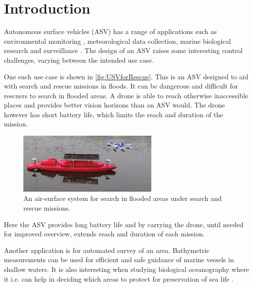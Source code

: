 \chapter{Introduction}

Autonomous surface vehicles (ASV) has a range of applications such as environmental monitoring \cite[p. 745]{MAHsieh}, meteorological data collection, marine biological research and surveillance \cite[p. 8-10]{FFahimi}.
The design of an ASV raises some interesting control challenges, varying between the intended use case.

One such use case is shown in \autoref{fig:USVforRescue}. 
This is an ASV designed to aid with search and rescue missions in floods. 
It can be dangerous and difficult for rescuers to search in flooded areas. 
A drone is able to reach otherwise inaccessible places and provides better vision horizons than an ASV would. 
The drone however has short battery life, which limits the reach and duration of the mission.
%
\begin{figure}[H]
  \vspace{3mm}
  \includegraphics[width=0.62\textwidth]{figures/USVforRescue.pdf}
  \caption{An air-surface system for search in flooded areas under search and rescue missions.\cite{JZhang}}
  \label{fig:USVforRescue}
\end{figure}
\vspace{-6mm}
%
Here the ASV provides long battery life and by carrying the drone, until needed for improved overview, extends reach and duration of each mission.\cite{JZhang}



Another application is for automated survey of an area.
Bathymetric measurements can be used for efficient and safe guidance of marine vessels in shallow waters. 
It is also interesting when studying biological oceanography where it i.e. can help in deciding which areas to protect for preservation of sea life \cite{NOService}. 



